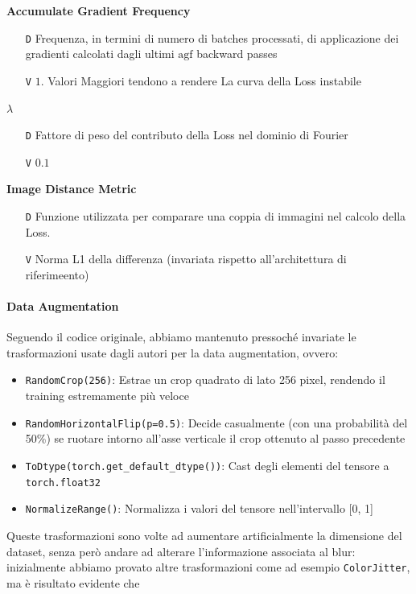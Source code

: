 \documentclass[a4paper,10pt,twocolumn]{article}
\begin{document}
\textbf{Accumulate Gradient Frequency}
\begin{itemize}[topsep=0pt, noitemsep]
  \item[\texttt{D}] Frequenza, in termini di numero di batches processati, di applicazione dei gradienti calcolati dagli ultimi
  $\mathrm{agf}$ backward passes
  \item[\texttt{V}] $1$. Valori Maggiori tendono a rendere La curva della Loss instabile
\end{itemize}

\textbf{$\lambda$}
\begin{itemize}[topsep=0pt, noitemsep]
  \item[\texttt{D}] Fattore di peso del contributo della Loss nel dominio di Fourier
  \item[\texttt{V}] $0.1$
\end{itemize}

\textbf{Image Distance Metric}
\begin{itemize}[topsep=0pt, noitemsep]
  \item[\texttt{D}] Funzione utilizzata per comparare una coppia di immagini nel calcolo della Loss.
  \item[\texttt{V}] Norma L1 della differenza (invariata rispetto all'architettura di riferimeento)
\end{itemize}

\paragraph{Data Augmentation}

Seguendo il codice originale, abbiamo mantenuto pressoché invariate le trasformazioni usate dagli autori per la data augmentation, ovvero:
\begin{itemize}
  \item \texttt{RandomCrop(256)}: Estrae un crop quadrato di lato 256 pixel, rendendo il training estremamente più veloce
  \item \texttt{RandomHorizontalFlip(p=0.5)}: Decide casualmente (con una probabilità del 50\%) se ruotare intorno all'asse verticale il crop ottenuto al passo precedente
  \item \texttt{ToDtype(torch.get\_default\_dtype())}: Cast degli elementi del tensore a \texttt{torch.float32}
  \item \texttt{NormalizeRange()}: Normalizza i valori del tensore nell'intervallo [0, 1]
\end{itemize}

Queste trasformazioni sono volte ad aumentare artificialmente la dimensione del dataset, senza però andare ad alterare l'informazione associata al blur: inizialmente abbiamo provato altre trasformazioni come ad esempio
\texttt{ColorJitter}, ma è risultato evidente che
\end{document}
